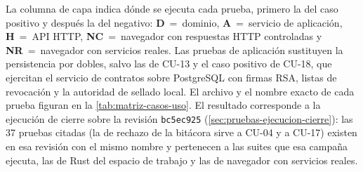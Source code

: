 La columna de capa indica dónde se ejecuta cada prueba, primero la del caso positivo y después la del negativo: \textbf{D}~=~dominio, \textbf{A}~=~servicio de aplicación, \textbf{H}~=~API HTTP, \textbf{NC}~=~navegador con respuestas HTTP controladas y \textbf{NR}~=~navegador con servicios reales. Las pruebas de aplicación sustituyen la persistencia por dobles, salvo las de CU-13 y el caso positivo de CU-18, que ejercitan el servicio de contratos sobre PostgreSQL con firmas RSA, listas de revocación y la autoridad de sellado local. El archivo y el nombre exacto de cada prueba figuran en la \cref{tab:matriz-casos-uso}. El resultado corresponde a la ejecución de cierre sobre la revisión \texttt{bc5ec925} (\cref{sec:pruebas-ejecucion-cierre}): las 37 pruebas citadas (la de rechazo de la bitácora sirve a CU-04 y a CU-17) existen en esa revisión con el mismo nombre y pertenecen a las suites que esa campaña ejecuta, las de Rust del espacio de trabajo y las de navegador con servicios reales.

\begingroup

